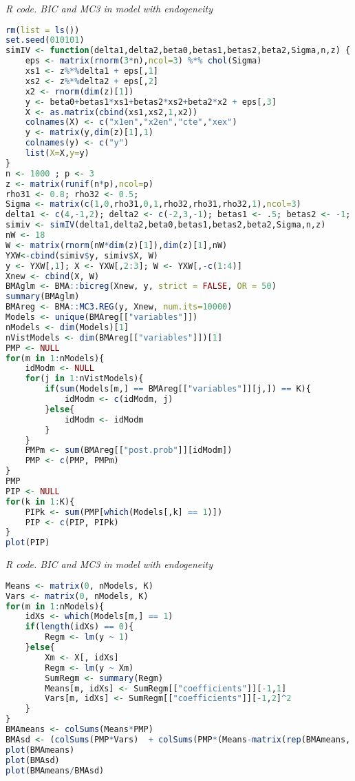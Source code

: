 \begin{enumerate}[leftmargin=*]
\begin{tcolorbox}[enhanced,width=4.67in,center upper,
	fontupper=\large\bfseries,drop shadow southwest,sharp corners]
	\textit{R code. BIC and MC3 in model with endogeneity}
	\begin{VF}
		\begin{lstlisting}[language=R]
rm(list = ls())
set.seed(010101)
simIV <- function(delta1,delta2,beta0,betas1,betas2,beta2,Sigma,n,z) {
	eps <- matrix(rnorm(3*n),ncol=3) %*% chol(Sigma)
	xs1 <- z%*%delta1 + eps[,1]
	xs2 <- z%*%delta2 + eps[,2]
	x2 <- rnorm(dim(z)[1])
	y <- beta0+betas1*xs1+betas2*xs2+beta2*x2 + eps[,3]
	X <- as.matrix(cbind(xs1,xs2,1,x2)) 
	colnames(X) <- c("x1en","x2en","cte","xex")
	y <- matrix(y,dim(z)[1],1)
	colnames(y) <- c("y")
	list(X=X,y=y)
}
n <- 1000 ; p <- 3 
z <- matrix(runif(n*p),ncol=p)
rho31 <- 0.8; rho32 <- 0.5;
Sigma <- matrix(c(1,0,rho31,0,1,rho32,rho31,rho32,1),ncol=3)
delta1 <- c(4,-1,2); delta2 <- c(-2,3,-1); betas1 <- .5; betas2 <- -1; beta2 <- 1; beta0 <- 2
simiv <- simIV(delta1,delta2,beta0,betas1,betas2,beta2,Sigma,n,z)
nW <- 18
W <- matrix(rnorm(nW*dim(z)[1]),dim(z)[1],nW)
YXW<-cbind(simiv$y, simiv$X, W)
y <- YXW[,1]; X <- YXW[,2:3]; W <- YXW[,-c(1:4)]
Xnew <- cbind(X, W)
BMAglm <- BMA::bicreg(Xnew, y, strict = FALSE, OR = 50) 
summary(BMAglm)
BMAreg <- BMA::MC3.REG(y, Xnew, num.its=10000)
Models <- unique(BMAreg[["variables"]])
nModels <- dim(Models)[1]
nVistModels <- dim(BMAreg[["variables"]])[1]
PMP <- NULL
for(m in 1:nModels){
	idModm <- NULL
	for(j in 1:nVistModels){
		if(sum(Models[m,] == BMAreg[["variables"]][j,]) == K){
			idModm <- c(idModm, j)
		}else{
			idModm <- idModm
		} 
	}
	PMPm <- sum(BMAreg[["post.prob"]][idModm])
	PMP <- c(PMP, PMPm)
}
PMP
PIP <- NULL
for(k in 1:K){
	PIPk <- sum(PMP[which(Models[,k] == 1)])
	PIP <- c(PIP, PIPk)
}
plot(PIP)
\end{lstlisting}
	\end{VF}
\end{tcolorbox} 

\begin{tcolorbox}[enhanced,width=4.67in,center upper,
	fontupper=\large\bfseries,drop shadow southwest,sharp corners]
	\textit{R code. BIC and MC3 in model with endogeneity}
	\begin{VF}
		\begin{lstlisting}[language=R]
Means <- matrix(0, nModels, K)
Vars <- matrix(0, nModels, K)
for(m in 1:nModels){
	idXs <- which(Models[m,] == 1)
	if(length(idXs) == 0){
		Regm <- lm(y ~ 1)
	}else{
		Xm <- X[, idXs]
		Regm <- lm(y ~ Xm)
		SumRegm <- summary(Regm)
		Means[m, idXs] <- SumRegm[["coefficients"]][-1,1]
		Vars[m, idXs] <- SumRegm[["coefficients"]][-1,2]^2 
	}
}
BMAmeans <- colSums(Means*PMP)
BMAsd <- (colSums(PMP*Vars)  + colSums(PMP*(Means-matrix(rep(BMAmeans, each = nModels), nModels, K))^2))^0.5 
plot(BMAmeans)
plot(BMAsd)
plot(BMAmeans/BMAsd)
\end{lstlisting}
	\end{VF}
\end{tcolorbox} 


\end{enumerate}
